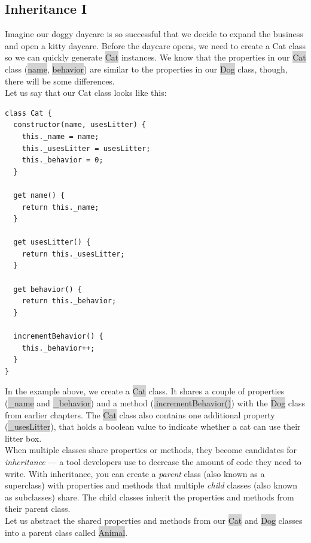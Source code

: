 \documentclass[11pt]{article}
\begin{document}
\subsection{Inheritance I}
Imagine our doggy daycare is so successful that we decide to expand the business and open a kitty daycare. Before the daycare opens, we need to create a Cat class so we can quickly generate \colorbox{lightgray}{Cat} instances. We know that the properties in our \colorbox{lightgray}{Cat} class (\colorbox{lightgray}{name}, \colorbox{lightgray}{behavior}) are similar to the properties in our \colorbox{lightgray}{Dog} class, though, there will be some differences. \\
\newline
Let us say that our Cat class looks like this:
\begin{lstlisting}
class Cat {
  constructor(name, usesLitter) {
    this._name = name;
    this._usesLitter = usesLitter;
    this._behavior = 0;
  }

  get name() {
    return this._name;
  }

  get usesLitter() {
    return this._usesLitter;
  }

  get behavior() {
    return this._behavior;
  }  

  incrementBehavior() {
    this._behavior++;
  }
}
\end{lstlisting}
In the example above, we create a \colorbox{lightgray}{Cat} class. It shares a couple of properties (\colorbox{lightgray}{\_name} and \colorbox{lightgray}{\_behavior}) and a method (\colorbox{lightgray}{.incrementBehavior()}) with the \colorbox{lightgray}{Dog} class from earlier chapters. The \colorbox{lightgray}{Cat} class also contains one additional property (\colorbox{lightgray}{\_usesLitter}), that holds a boolean value to indicate whether a cat can use their litter box. \\
\newline
When multiple classes share properties or methods, they become candidates for \textit{inheritance} — a tool developers use to decrease the amount of code they need to write. With inheritance, you can create a \textit{parent} class (also known as a superclass) with properties and methods that multiple \textit{child} classes (also known as subclasses) share. The child classes inherit the properties and methods from their parent class. \\
\newline
Let us abstract the shared properties and methods from our \colorbox{lightgray}{Cat} and \colorbox{lightgray}{Dog} classes into a parent class called \colorbox{lightgray}{Animal}. 
\end{document}
